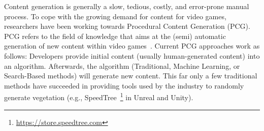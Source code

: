 

Content generation is generally a slow, tedious, costly, and error-prone manual process. To cope with the growing demand for content for video games, researchers have been working towards Procedural Content Generation (PCG). PCG refers to the field of knowledge that aims at the (semi) automatic generation of new content within video games~\cite{hendrikx2013procedural}. Current PCG approaches work as follows: Developers provide initial content (usually human-generated content) into an algorithm. Afterwards, the algorithm (Traditional, Machine Learning, or Search-Based methods) will generate new content. This far only a few traditional methods have succeeded in providing tools used by the industry to randomly generate vegetation (e.g., SpeedTree~\footnote{\url{https://store.speedtree.com}} in Unreal and Unity).

